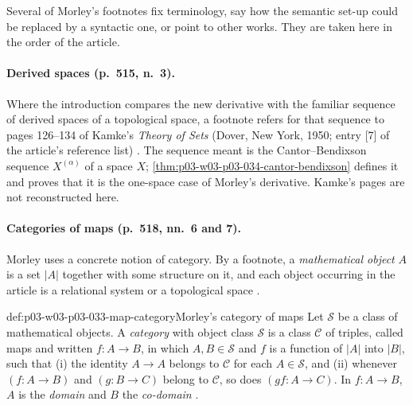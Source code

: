 Several of Morley's footnotes fix terminology, say how the semantic
set-up could be replaced by a syntactic one, or point to other works. They
are taken here in the order of the article.

\paragraph{Derived spaces (p.~515, n.~3).} Where the introduction
compares the new derivative with the familiar sequence of derived spaces
of a topological space, a footnote refers for that sequence to pages
126--134 of Kamke's \emph{Theory of Sets} (Dover, New York, 1950; entry
[7] of the article's reference list) \cite[p.~515, n.~3; p.~538]{Morley1965}.
The sequence meant is the Cantor--Bendixson sequence \(X^{(\alpha)}\) of
a space \(X\); \cref{thm:p03-w03-p03-034-cantor-bendixson} defines it and
proves that it is the one-space case of Morley's derivative. Kamke's pages
are not reconstructed here.

\paragraph{Categories of maps (p.~518, nn.~6 and 7).} Morley uses a
concrete notion of category. By a footnote, a \emph{mathematical object}
\(A\) is a set \(|A|\) together with some structure on it, and each
object occurring in the article is a relational system or a topological space
\cite[p.~518, n.~6]{Morley1965}.

\begin{hbdefinition}{def:p03-w03-p03-033-map-category}{Morley's category of maps}
Let \(\mathscr S\) be a class of mathematical objects. A \emph{category}
with object class \(\mathscr S\) is a class \(\mathscr C\) of triples,
called maps and written \(f:A\to B\), in which \(A,B\in\mathscr S\) and
\(f\) is a function of \(|A|\) into \(|B|\), such that (i) the identity
\(A\to A\) belongs to \(\mathscr C\) for each \(A\in\mathscr S\), and
(ii) whenever \((f:A\to B)\) and \((g:B\to C)\) belong to
\(\mathscr C\), so does \((gf:A\to C)\). In \(f:A\to B\), \(A\) is the
\emph{domain} and \(B\) the \emph{co-domain}
\cite[p.~518]{Morley1965}.
\end{hbdefinition}

